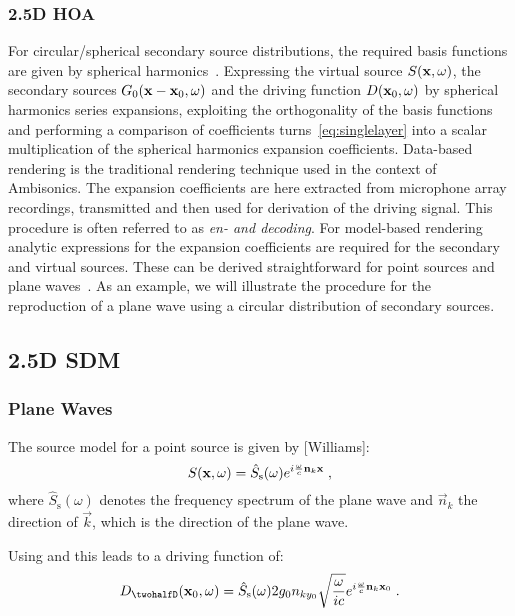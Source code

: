 \documentclass{article}
\begin{document}
\subsubsection{2.5D HOA}
\label{sec:hoa25d}
For circular/spherical secondary source distributions, the required
basis functions are given by spherical harmonics~\cite{Ahrens08:Acta,Wu08:ICASSP,Fazi:PhD}.
Expressing the virtual source $S( \mathbf{x} ,\omega)$, the secondary sources
$G_0( \mathbf{x} - \mathbf{x} _0,\omega)$ and the driving function
$D( \mathbf{x} _0,\omega)$ by spherical harmonics series expansions,
exploiting the orthogonality of the basis functions and performing a
comparison of coefficients turns~\eqref{eq:singlelayer} into a scalar
multiplication of the spherical harmonics expansion coefficients.
Data-based rendering is the traditional rendering technique used in the context of Ambisonics.
The expansion coefficients are here extracted from microphone array recordings,
transmitted and then used for derivation of the driving signal. This
procedure is often referred to as {\em en- and decoding}.
For model-based rendering analytic expressions for the expansion
coefficients are required for the secondary and virtual sources. These can be
derived straightforward for point sources and plane waves~\cite{Ahrens08:Acta}.
As an example, we will illustrate the procedure for the reproduction of a
plane wave using a circular distribution of secondary sources.\\

\subsection{2.5D SDM}
\label{sec:sdm25d}

\subsubsection{Plane Waves}
The source model for a point source is given by [Williams]:
\begin{equation} 
    S(  \mathbf{x}  ,\omega) = 
    \hat{S}_\text{s}(\omega)
    e^{i\frac{\omega}{c}  \mathbf{n} _k   \mathbf{x}  }
    \;,
\end{equation}
where $\hat{S}_\text{s}(\omega)$ denotes the frequency spectrum of the plane
wave and $\vec{n}_k$ the direction of $\vec{k}$, which is the direction of the
plane wave.

Using  and  this leads to a driving function of:
\begin{equation}
    D_\twohalfD(\x_0,\omega) = \hat{S}_\text{s}(\omega)
    2 g_0 n_{ky_0} \sqrt{\frac{\omega}{ic}}
    e^{i\omegac \vec{n}_k \x_0}
    \qp
    \label{Dpw}
\end{equation}
\end{document}
